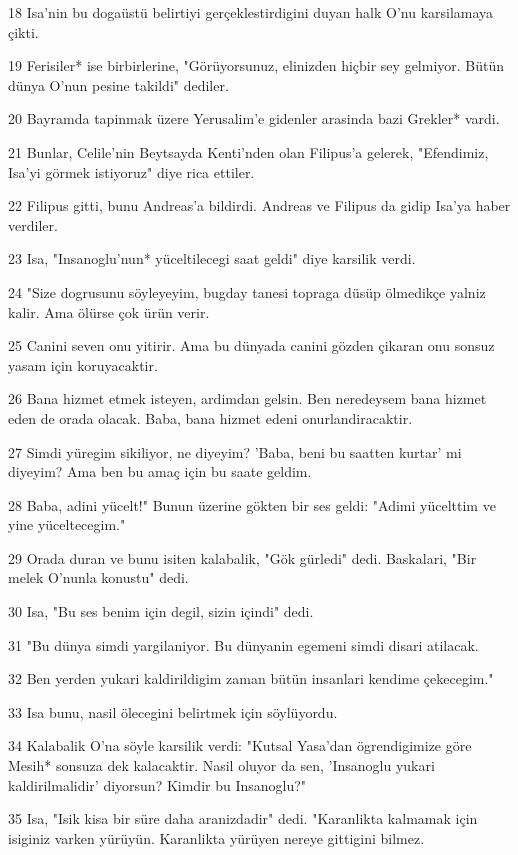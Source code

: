 \par 18 Isa'nin bu dogaüstü belirtiyi gerçeklestirdigini duyan halk O'nu karsilamaya çikti.
\par 19 Ferisiler* ise birbirlerine, "Görüyorsunuz, elinizden hiçbir sey gelmiyor. Bütün dünya O'nun pesine takildi" dediler.
\par 20 Bayramda tapinmak üzere Yerusalim'e gidenler arasinda bazi Grekler* vardi.
\par 21 Bunlar, Celile'nin Beytsayda Kenti'nden olan Filipus'a gelerek, "Efendimiz, Isa'yi görmek istiyoruz" diye rica ettiler.
\par 22 Filipus gitti, bunu Andreas'a bildirdi. Andreas ve Filipus da gidip Isa'ya haber verdiler.
\par 23 Isa, "Insanoglu'nun* yüceltilecegi saat geldi" diye karsilik verdi.
\par 24 "Size dogrusunu söyleyeyim, bugday tanesi topraga düsüp ölmedikçe yalniz kalir. Ama ölürse çok ürün verir.
\par 25 Canini seven onu yitirir. Ama bu dünyada canini gözden çikaran onu sonsuz yasam için koruyacaktir.
\par 26 Bana hizmet etmek isteyen, ardimdan gelsin. Ben neredeysem bana hizmet eden de orada olacak. Baba, bana hizmet edeni onurlandiracaktir.
\par 27 Simdi yüregim sikiliyor, ne diyeyim? 'Baba, beni bu saatten kurtar' mi diyeyim? Ama ben bu amaç için bu saate geldim.
\par 28 Baba, adini yücelt!" Bunun üzerine gökten bir ses geldi: "Adimi yücelttim ve yine yüceltecegim."
\par 29 Orada duran ve bunu isiten kalabalik, "Gök gürledi" dedi. Baskalari, "Bir melek O'nunla konustu" dedi.
\par 30 Isa, "Bu ses benim için degil, sizin içindi" dedi.
\par 31 "Bu dünya simdi yargilaniyor. Bu dünyanin egemeni simdi disari atilacak.
\par 32 Ben yerden yukari kaldirildigim zaman bütün insanlari kendime çekecegim."
\par 33 Isa bunu, nasil ölecegini belirtmek için söylüyordu.
\par 34 Kalabalik O'na söyle karsilik verdi: "Kutsal Yasa'dan ögrendigimize göre Mesih* sonsuza dek kalacaktir. Nasil oluyor da sen, 'Insanoglu yukari kaldirilmalidir' diyorsun? Kimdir bu Insanoglu?"
\par 35 Isa, "Isik kisa bir süre daha aranizdadir" dedi. "Karanlikta kalmamak için isiginiz varken yürüyün. Karanlikta yürüyen nereye gittigini bilmez.

